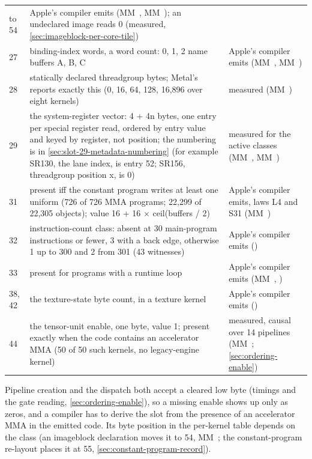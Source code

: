 \begin{xltabular}{\linewidth}{@{}l>{\hsize}X>{\hsize}X@{}}
to 54 & Apple's compiler emits (MM~, MM~);
an undeclared image reads 0 (measured, 
\cref{sec:imageblock-per-core-tile}) \\
27 & binding-index words, a word count: 0, 1, 2 name buffers A, B, C & Apple's compiler emits (MM~, MM~) \\
28 & statically declared threadgroup bytes; Metal's
 reports exactly this (0, 16, 64,
128, 16,896 over eight kernels) & measured (MM~) \\
29 & the system-register vector: 4 + 4n bytes, one entry per special register
read, ordered by entry value and keyed by register, not position; the
numbering is in
\cref{sec:slot-29-metadata-numbering} (for example
SR130, the lane index, is entry 52; SR156, threadgroup position x, is 0) & measured for the active classes (MM~, MM~) \\
31 & present iff the constant program writes at least one uniform (726 of 726
MMA programs; 22,299 of 22,305 objects); value 16 + 16 $\times$ ceil(buffers /
2) & Apple's compiler emits, laws L4 and S31 (MM~) \\
32 & instruction-count class: absent at 30 main-program instructions or
fewer, 3 with a back edge, otherwise 1 up to 300 and 2 from 301 (43
witnesses) & Apple's compiler emits () \\
33 & present for programs with a runtime loop & Apple's compiler emits (MM~,
) \\
38, 42 & the texture-state byte count, in a texture kernel & Apple's compiler emits () \\
44 & the tensor-unit enable, one byte, value 1; present exactly when the code
contains an accelerator MMA (50 of 50 such kernels, no legacy-engine
kernel) & measured, causal over 14 pipelines (MM~; 
\cref{sec:ordering-enable}) \\
\bottomrule
\end{xltabular}

Pipeline creation and the dispatch both accept a cleared low byte (timings and the gate reading,
\cref{sec:ordering-enable}), so a missing enable shows up only as zeros, and a compiler has to derive the slot from
the presence of an accelerator MMA in the emitted code. Its byte position in the per-kernel table depends on the class (an
imageblock declaration moves it to 54, MM~; the constant-program re-layout places it at 55,
\cref{sec:constant-program-record}).

